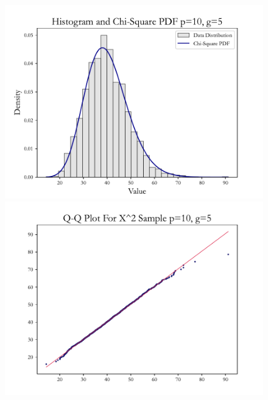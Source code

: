\documentclass{article} %
\begin{document}
\begin{figure}[H]
\begin{minipage}[b]{0.49\textwidth}
        \includegraphics[width=\textwidth]{img/b/hist_plot_p=10_g=5.pdf}
    \end{minipage}
    \hfill
    \begin{minipage}[b]{0.49\textwidth}
        \centering
        \includegraphics[width=\textwidth]{img/b/qq_plot_p=10_g=5.pdf}
    \end{minipage}
    \hfill
    \begin{minipage}[b]{0.49\textwidth}
        \centering

\end{minipage}
\end{figure}
\end{document}

